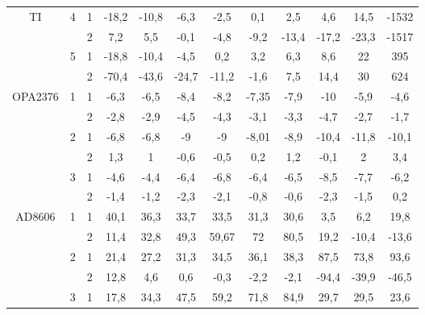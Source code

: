 \begin{table}[H]
\begin{adjustwidth}{-1em}{}
\begin{tabular}{|c|c|c|c|c|c|c|c|c|c|c|c|}
  \cline{2-12}   TI     & \multirow{2}[4]{*}{4} & 1     & -18,2 & -10,8 & -6,3  & -2,5  & 0,1   & 2,5   & 4,6   & 14,5  & -1532 \bigstrut\\
  \cline{3-12}          &       & 2     & 7,2   & 5,5   & -0,1  & -4,8  & -9,2  & -13,4 & -17,2 & -23,3 & -1517 \bigstrut\\
  \cline{2-12}          & \multirow{2}[4]{*}{5} & 1     & -18,8 & -10,4 & -4,5  & 0,2   & 3,2   & 6,3   & 8,6   & 22    & 395 \bigstrut\\
  \cline{3-12}          &       & 2     & -70,4 & -43,6 & -24,7 & -11,2 & -1,6  & 7,5   & 14,4  & 30    & 624 \bigstrut\\
      \hline
      \multicolumn{1}{|c|}{\multirow{6}[12]{*}{OPA2376}} & \multirow{2}[4]{*}{1} & 1     & -6,3  & -6,5  & -8,4  & -8,2  & -7,35 & -7,9  & -10   & -5,9  & -4,6 \bigstrut\\
  \cline{3-12}          &       & 2     & -2,8  & -2,9  & -4,5  & -4,3  & -3,1  & -3,3  & -4,7  & -2,7  & -1,7 \bigstrut\\
  \cline{2-12}          & \multirow{2}[4]{*}{2} & 1     & -6,8  & -6,8  & -9    & -9    & -8,01 & -8,9  & -10,4 & -11,8 & -10,1 \bigstrut\\
  \cline{3-12}          &       & 2     & 1,3   & 1     & -0,6  & -0,5  & 0,2   & 1,2   & -0,1  & 2     & 3,4 \bigstrut\\
  \cline{2-12} Fulihao   & \multirow{2}[4]{*}{3} & 1     & -4,6  & -4,4  & -6,4  & -6,8  & -6,4  & -6,5  & -8,5  & -7,7  & -6,2 \bigstrut\\
  \cline{3-12}          &       & 2     & -1,4  & -1,2  & -2,3  & -2,1  & -0,8  & -0,6  & -2,3  & -1,5  & 0,2 \bigstrut\\
      \hline
      \multicolumn{1}{|c|}{\multirow{10}[20]{*}{AD8606}} & \multirow{2}[4]{*}{1} & 1     & 40,1  & 36,3  & 33,7  & 33,5  & 31,3  & 30,6  & 3,5   & 6,2   & 19,8 \bigstrut\\
  \cline{3-12}          &       & 2     & 11,4  & 32,8  & 49,3  & 59,67 & 72    & 80,5  & 19,2  & -10,4 & -13,6 \bigstrut\\
  \cline{2-12}          & \multirow{2}[4]{*}{2} & 1     & 21,4  & 27,2  & 31,3  & 34,5  & 36,1  & 38,3  & 87,5  & 73,8  & 93,6 \bigstrut\\
  \cline{3-12}          &       & 2     & 12,8  & 4,6   & 0,6   & -0,3  & -2,2  & -2,1  & -94,4 & -39,9 & -46,5 \bigstrut\\
  \cline{2-12}          & \multirow{2}[4]{*}{3} & 1     & 17,8  & 34,3  & 47,5  & 59,2  & 71,8  & 84,9  & 29,7  & 29,5  & 23,6 \bigstrut\\

\end{tabular}
\end{adjustwidth}
\end{table}
